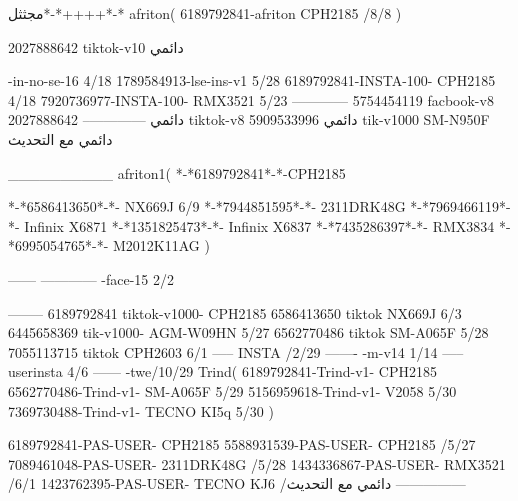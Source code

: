 مجثثل*-*++++*-*
afriton(
6189792841-afriton CPH2185  /8/8
)

2027888642 tiktok-v10
دائمي

-in-no-se-16 4/18
1789584913-lse-ins-v1 5/28
6189792841-INSTA-100- CPH2185 4/18
7920736977-INSTA-100- RMX3521 5/23
------------
5754454119 facbook-v8
دائمي
--------------
2027888642 tiktok-v8
دائمي
5909533996 tik-v1000  SM-N950F
دائمي مع التحديث

__________
afriton1(
*-*6189792841*-*-CPH2185

*-*6586413650*-*- NX669J  6/9
*-*7944851595*-*-   2311DRK48G  \5
*-*7969466119*-*-   Infinix X6871  \5
*-*1351825473*-*-   Infinix X6837  \5
*-*7435286397*-*-   RMX3834  \5
*-*6995054765*-*-   M2012K11AG  \5
)


------
------------
-face-15 2/2

--------
6189792841 tiktok-v1000- CPH2185 
6586413650 tiktok NX669J  6/3
6445658369 tik-v1000- AGM-W09HN  5/27
6562770486 tiktok  SM-A065F   5/28
7055113715 tiktok  CPH2603   6/1
-----
 INSTA /2/29
-------
-m-v14 1/14
-----
userinsta 4/6
------
-twe/10/29
Trind(
6189792841-Trind-v1- CPH2185 
6562770486-Trind-v1- SM-A065F   5/29
5156959618-Trind-v1- V2058   5/30
7369730488-Trind-v1- TECNO KI5q   5/30
)


6189792841-PAS-USER- CPH2185 
5588931539-PAS-USER-  CPH2185  /5/27
7089461048-PAS-USER-  2311DRK48G  /5/28
1434336867-PAS-USER-  RMX3521  /6/1
1423762395-PAS-USER- TECNO KJ6  /دائمي مع التحديث
    ---------------
